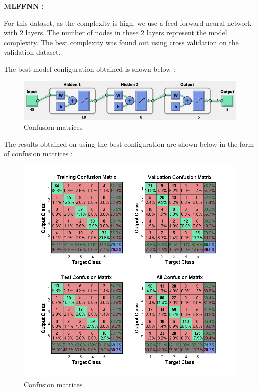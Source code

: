 \documentclass{article}
\begin{document}
\begin{flushleft}
\textbf{MLFFNN :} \\[10pt]
\begin{flushleft}

For this dataset, as the complexity is high, we use a feed-forward neural network with 2 layers.  The number of nodes in these 2 layers represent the model complexity. The best complexity was found out using cross validation on the validation dataset. 

The best model configuration obtained is shown below :

\end{flushleft}

\begin{figure}[H]
\centering
\includegraphics[width=\linewidth]{Classification/images/net_config.png}
\caption{Confusion matrices}
\end{figure}




The results obtained on using the best configuration are shown below in the form of confusion matrices :


\begin{figure}[H]
\centering
\includegraphics[width=\linewidth]{Classification/images/confusion.png}
\caption{Confusion matrices}
\end{figure}



\end{flushleft}
\end{document}
